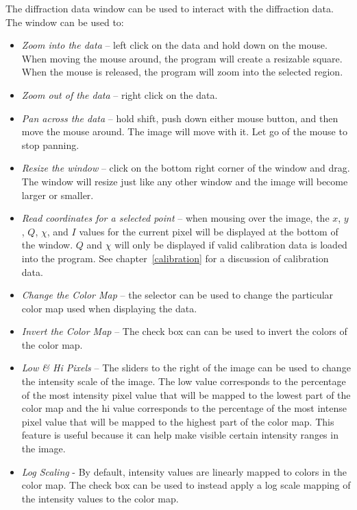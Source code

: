 The diffraction data window can be used to interact with the
diffraction data. The window can be used to:
\begin{itemize}
    \item {\em Zoom into the data} -- left click on the data and 
    hold down on the mouse. When moving the mouse around, the
    program will create a resizable square. When the mouse is released,
    the program will zoom into the selected region.
    \item {\em Zoom out of the data} -- right click on
    the data.
    \item {\em Pan across the data} -- hold shift, push down either mouse
    button, and then move the mouse around. The image will move 
    with it. Let go of the mouse to stop panning.
    \item {\em Resize the window} -- click on the bottom right corner of
    the window and drag. The window will resize just like any
    other window and the image will become larger or smaller.  
    \item {\em Read coordinates for a selected point} -- when mousing
    over the image, the $x$, $y$, $Q$, $\chi$, and $I$
    values for the current pixel will be displayed at the bottom of the
    window. $Q$ and $\chi$ will only be displayed if valid calibration
    data is loaded into the program. See chapter~\ref{calibration} for
    a discussion of calibration data.
    \item {\em Change the Color Map} -- the  selector 
    can be used to change the particular color map used when displaying the 
    data.
    \item {\em Invert the Color Map} -- The  check box can 
    can be used to invert the colors of the color map.
    \item {\em Low \& Hi Pixels} -- The sliders to the right of the 
    image can be used to change the intensity scale of the
    image. The low value corresponds to the percentage of
    the most intensity pixel value that will be mapped to the lowest part of
    the color map and the hi value corresponds to the percentage of
    the most intense pixel value that will be mapped to the highest 
    part of the color map.  This feature is useful because it can help make 
    visible certain intensity ranges in the image.
    \item {\em Log Scaling} - By default, intensity values are linearly 
    mapped to colors in the color map. The  check box 
    can be used to instead apply a log scale mapping of the intensity 
    values to the color map.
\end{itemize}

